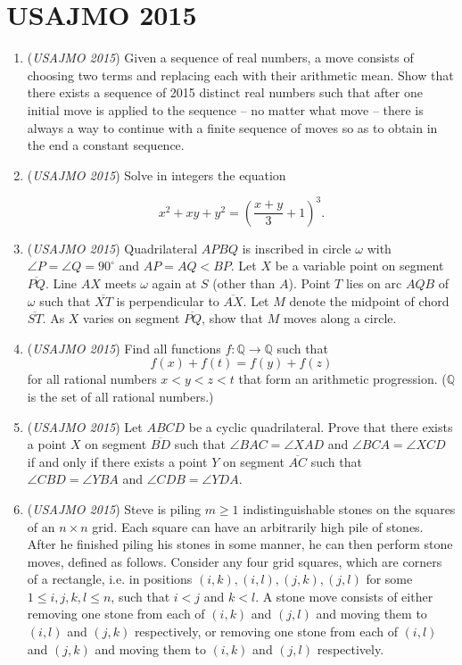 \section{USAJMO 2015}
        \begin{enumerate}
        	\item (\textit{USAJMO 2015}) Given a sequence of real numbers, a move consists of choosing two terms and replacing each with their arithmetic mean. Show that there exists a sequence of 2015 distinct real numbers such that after one initial move is applied to the sequence -- no matter what move -- there is always a way to continue with a finite sequence of moves so as to obtain in the end a constant sequence.


 

	\item (\textit{USAJMO 2015}) Solve in integers the equation

 \[x^2+xy+y^2 = \left(\frac{x+y}{3}+1\right)^3.\]


	\item (\textit{USAJMO 2015}) Quadrilateral $APBQ$ is inscribed in circle $\omega$ with $\angle P = \angle Q = 90^{\circ}$ and $AP = AQ < BP$. Let $X$ be a variable point on segment $\overline{PQ}$. Line $AX$ meets $\omega$ again at $S$ (other than $A$). Point $T$ lies on arc $AQB$ of $\omega$ such that $\overline{XT}$ is perpendicular to $\overline{AX}$. Let $M$ denote the midpoint of chord $\overline{ST}$. As $X$ varies on segment $\overline{PQ}$, show that $M$ moves along a circle.


 

	\item (\textit{USAJMO 2015}) Find all functions $f:\mathbb{Q}\rightarrow\mathbb{Q}$ such that
 \[f(x)+f(t)=f(y)+f(z)\]for all rational numbers $x<y<z<t$ that form an arithmetic progression. ($\mathbb{Q}$ is the set of all rational numbers.)


 

	\item (\textit{USAJMO 2015}) Let $ABCD$ be a cyclic quadrilateral. Prove that there exists a point $X$ on segment $\overline{BD}$ such that $\angle BAC=\angle XAD$ and $\angle BCA=\angle XCD$ if and only if there exists a point $Y$ on segment $\overline{AC}$ such that $\angle CBD=\angle YBA$ and $\angle CDB=\angle YDA$.


 

	\item (\textit{USAJMO 2015}) Steve is piling $m\geq 1$ indistinguishable stones on the squares of an $n\times n$ grid. Each square can have an arbitrarily high pile of stones. After he finished piling his stones in some manner, he can then perform stone moves, defined as follows. Consider any four grid squares, which are corners of a rectangle, i.e. in positions $(i, k), (i, l), (j, k), (j, l)$ for some $1\leq i, j, k, l\leq n$, such that $i<j$ and $k<l$. A stone move consists of either removing one stone from each of $(i, k)$ and $(j, l)$ and moving them to $(i, l)$ and $(j, k)$ respectively, or removing one stone from each of $(i, l)$ and $(j, k)$ and moving them to $(i, k)$ and $(j, l)$ respectively.



\end{enumerate}
